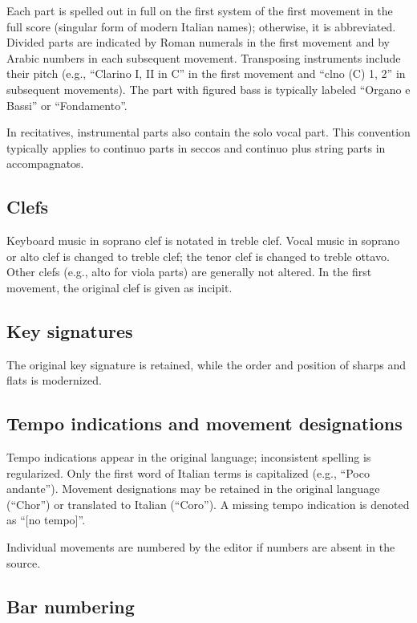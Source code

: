 \documentclass[abbrwidth=7em,shorttitlesize=55]{ees}
\begin{document}
Each part is spelled out in full on the first system of the first movement in the full score (singular form of modern Italian names); otherwise, it is abbreviated. Divided parts are indicated by Roman numerals in the first movement and by Arabic numbers in each subsequent movement. Transposing instruments include their pitch (e.g., “Clarino I, II in C” in the first movement and “clno (C) 1, 2” in subsequent movements). The part with figured bass is typically labeled “Organo e Bassi” or “Fondamento”.

In recitatives, instrumental parts also contain the solo vocal part. This convention typically applies to continuo parts in seccos and continuo plus string parts in accompagnatos.


\subsection{Clefs}

Keyboard music in soprano clef is notated in treble clef. Vocal music in soprano or alto clef is changed to treble clef; the tenor clef is changed to treble ottavo. Other clefs (e.g., alto for viola parts) are generally not altered. In the first movement, the original clef is given as incipit.


\subsection{Key signatures}

The original key signature is retained, while the order and position of sharps and flats is modernized.


\subsection{Tempo indications and movement designations}

Tempo indications appear in the original language; inconsistent spelling is regularized. Only the first word of Italian terms is capitalized (e.g., “Poco andante”). Movement designations may be retained in the original language (“Chor”) or translated to Italian (“Coro”). A missing tempo indication is denoted as “[no tempo]”.


Individual movements are numbered by the editor if numbers are absent in the source.


\subsection{Bar numbering}
\end{document}
